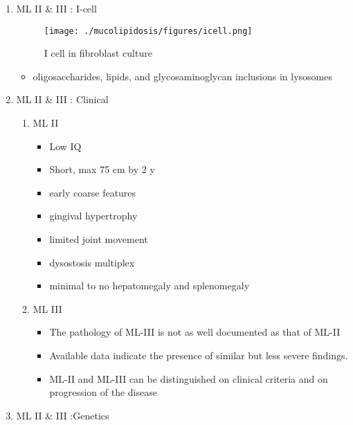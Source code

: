 \documentclass{scrartcl}
\begin{document}
\begin{enumerate}
\item ML II \& III : I-cell
\label{sec:org73ab319}

\begin{figure}[htbp]
\centering
\texttt{[image: ./mucolipidosis/figures/icell.png]}
\caption{\label{fig:org5f9e67f}
I cell in fibroblast culture}
\end{figure}

\begin{itemize}
\item oligosaccharides, lipids, and glycosaminoglycan inclusions in lysosomes
\end{itemize}

\item ML II \& III : Clinical
\label{sec:orgae57e18}

\begin{enumerate}
\item ML II
\label{sec:org779355c}
\begin{itemize}
\item Low IQ
\item Short, max 75 cm by 2 y
\item early coarse features
\item gingival hypertrophy
\item limited joint movement
\item dysostosis multiplex
\item minimal to no hepatomegaly and splenomegaly
\end{itemize}

\item ML III
\label{sec:orga81d6df}
\begin{itemize}
\item The pathology of ML-III is not as well documented as that of ML-II
\item Available data indicate the presence of similar but less severe
findings.

\item ML-II and ML-III can be distinguished on clinical criteria and on progression of the disease
\end{itemize}
\end{enumerate}

\item ML II \& III :Genetics
\label{sec:orgb41db78}


\end{enumerate}
\end{document}

